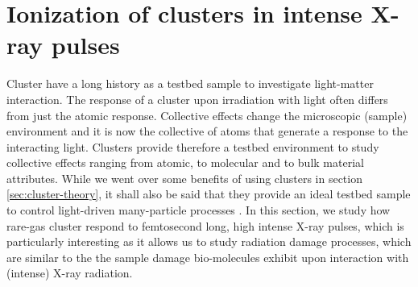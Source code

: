 \section{Ionization of clusters in intense X-ray pulses}\label{sec:ionizatin-of-ext-obj}
Cluster have a long history as a testbed sample to investigate light-matter interaction. The response of a cluster upon irradiation with light often differs from just the atomic response. Collective effects change the microscopic (sample) environment and it is now the collective of atoms that generate a response to the interacting light. Clusters provide therefore a testbed environment to study collective effects ranging from atomic, to molecular and to bulk material attributes. While we went over some benefits of using clusters in section \ref{sec:cluster-theory}, it shall also be said that they provide an ideal testbed sample to control light-driven many-particle processes \citep{Fennel-2010-RMP}. In this section, we study how rare-gas cluster respond to femtosecond long, high intense X-ray pulses, which is particularly interesting as it allows us to study radiation damage processes, which are similar to the the sample damage bio-molecules exhibit upon interaction with (intense) X-ray radiation.
%
%
%
